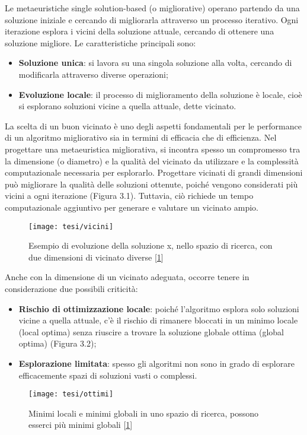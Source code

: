 Le metaeuristiche single solution-based (o migliorative) operano partendo da una soluzione iniziale e cercando di migliorarla attraverso un processo iterativo. Ogni iterazione esplora i vicini della soluzione attuale, cercando di ottenere una soluzione migliore. Le caratteristiche principali sono:
\begin{itemize}
    \item \textbf{Soluzione unica}: si lavora su una singola soluzione alla volta, cercando di modificarla attraverso diverse operazioni;
    \item \textbf{Evoluzione locale}: il processo di miglioramento della soluzione è locale, cioè si esplorano soluzioni vicine a quella attuale, dette vicinato.
\end{itemize}

La scelta di un buon vicinato è uno degli aspetti fondamentali per le performance di un algoritmo migliorativo sia in termini di efficacia che di efficienza. Nel progettare una metaeuristica migliorativa, si incontra spesso un compromesso tra la dimensione (o diametro) e la qualità del vicinato da utilizzare e la complessità computazionale necessaria per esplorarlo. Progettare vicinati di grandi dimensioni può migliorare la qualità delle soluzioni ottenute, poiché vengono considerati più vicini a ogni iterazione (Figura 3.1). Tuttavia, ciò richiede un tempo computazionale aggiuntivo per generare e valutare un vicinato ampio. \hypertarget{img1}{}
\begin{figure}[!ht] 
    \centering 
    \texttt{[image: tesi/vicini]} 
    \caption[Esempio di evoluzione della soluzione x, nello spazio di ricerca, con due dimensioni di vicinato diverse]{Esempio di evoluzione della soluzione x, nello spazio di ricerca, con due dimensioni di vicinato diverse [\hyperlink{bibliografia}{1}]} 
\end{figure}

Anche con la dimensione di un vicinato adeguata, occorre tenere in considerazione due possibili criticità:
\begin{itemize}
    \item \textbf{Rischio di ottimizzazione locale}: poiché l'algoritmo esplora solo soluzioni vicine a quella attuale, c'è il rischio di rimanere bloccati in un minimo locale (local optima) senza riuscire a trovare la soluzione globale ottima (global optima) (Figura 3.2);
    \item \textbf{Esplorazione limitata}: spesso gli algoritmi non sono in grado di esplorare efficacemente spazi di soluzioni vasti o complessi.
\end{itemize}
\hypertarget{img2}{}
\begin{figure}[!ht] 
    \centering 
    \texttt{[image: tesi/ottimi]} 
    \caption[Minimi locali e minimi globali in uno spazio di ricerca, possono esserci più minimi globali]{Minimi locali e minimi globali in uno spazio di ricerca, possono esserci più minimi globali [\hyperlink{bibliografia}{1}]}
\end{figure}

